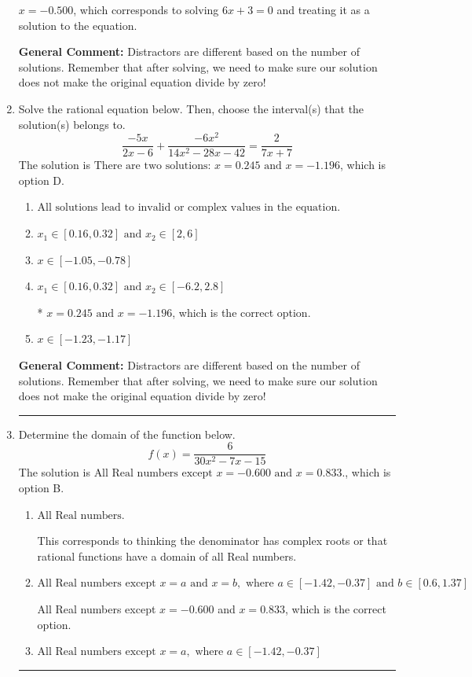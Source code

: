 \documentclass{extbook}[14pt]
\newcommand{\litem}[1]{\item #1

\rule{\textwidth}{0.4pt}}
\begin{document}
\begin{enumerate}
{\begin{enumerate}[label=\Alph*.]
$x = -0.500$, which corresponds to solving $6x + 3 = 0$ and treating it as a solution to the equation.
\end{enumerate}

\textbf{General Comment:} Distractors are different based on the number of solutions. Remember that after solving, we need to make sure our solution does not make the original equation divide by zero!
}
\litem{
Solve the rational equation below. Then, choose the interval(s) that the solution(s) belongs to.
\[ \frac{-5x}{2x -6} + \frac{-6x^{2}}{14x^{2} -28 x -42} = \frac{2}{7x + 7} \]The solution is \( \text{There are two solutions: } x = 0.245 \text{ and } x = -1.196 \), which is option D.\begin{enumerate}[label=\Alph*.]
\item \( \text{All solutions lead to invalid or complex values in the equation.} \)


\item \( x_1 \in [0.16, 0.32] \text{ and } x_2 \in [2,6] \)


\item \( x \in [-1.05,-0.78] \)


\item \( x_1 \in [0.16, 0.32] \text{ and } x_2 \in [-6.2,2.8] \)

* $x = 0.245 \text{ and } x = -1.196$, which is the correct option.
\item \( x \in [-1.23,-1.17] \)


\end{enumerate}

\textbf{General Comment:} Distractors are different based on the number of solutions. Remember that after solving, we need to make sure our solution does not make the original equation divide by zero!
}
\litem{
Determine the domain of the function below.
\[ f(x) = \frac{6}{30x^{2} -7 x -15} \]The solution is \( \text{All Real numbers except } x = -0.600 \text{ and } x = 0.833. \), which is option B.\begin{enumerate}[label=\Alph*.]
\item \( \text{All Real numbers.} \)

This corresponds to thinking the denominator has complex roots or that rational functions have a domain of all Real numbers.
\item \( \text{All Real numbers except } x = a \text{ and } x = b, \text{ where } a \in [-1.42, -0.37] \text{ and } b \in [0.6, 1.37] \)

All Real numbers except $x = -0.600$ and $x = 0.833$, which is the correct option.
\item \( \text{All Real numbers except } x = a, \text{ where } a \in [-1.42, -0.37] \)


\end{enumerate}}
\end{enumerate}
\end{document}
